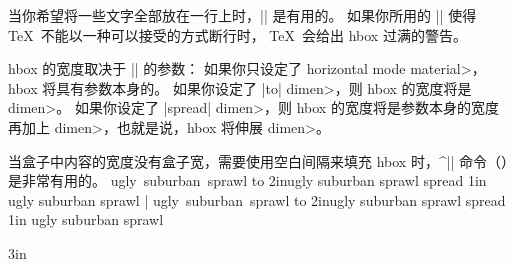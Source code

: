 当你希望将一些文字全部放在一行上时，|\hbox| 是有用的。
如果你所用的 |\hbox| 使得 \TeX\ 不能以一种可以接受的方式断行时，
\TeX\ 会给出 hbox 过满的警告。

hbox 的宽度取决于 |\hbox| 的参数：
\ulist\compact
\li 如果你只设定了 \<horizontal mode material>，hbox 将具有参数本身的。
\li 如果你设定了 |to| \<dimen>，则 hbox 的宽度将是 \<dimen>。
\li 如果你设定了 |spread| \<dimen>，则 hbox 的宽度将是参数本身的宽度再加上 \<dimen>，也就是说，hbox 将伸展 \<dimen>。
\endulist

当盒子中内容的宽度没有盒子宽，需要使用空白间隔来填充 hbox 时，^|\hfil| 命令（\xref\hfil ）是非常有用的。
\example
\hbox{ugly suburban sprawl}
\hbox to 2in{ugly \hfil suburban \hfil sprawl}
\hbox spread 1in {ugly \hfil suburban \hfil sprawl}
|
\produces
\hbox{ugly suburban sprawl}
\hbox to 2in{ugly \hfil suburban \hfil sprawl}
\hbox spread 1in {ugly \hfil suburban \hfil sprawl}

\doruler{\8\8\8}3{in}
\endexample
\enddesc

